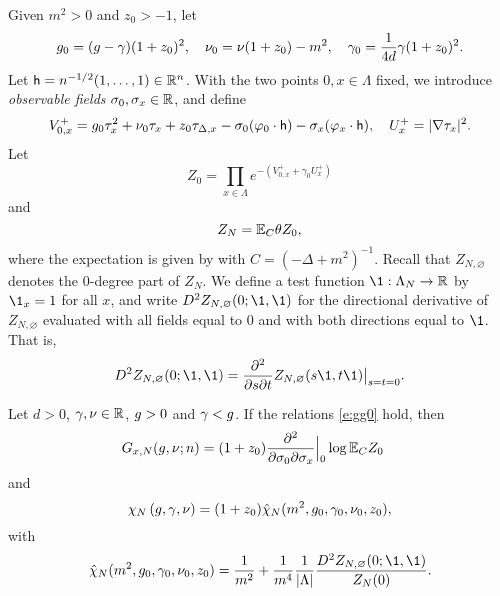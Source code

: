 Given $m^2>0$ and $z_0 >-1$, let
\begin{equation}
\label{e:gg0}
g_0 = (g - \gamma) (1 + z_0)^2,
	\quad
\nu_0 = \nu (1 + z_0) - m^2,
	\quad
\gamma_0 = \frac{1}{4d} \gamma (1 + z_0)^2.
\end{equation}
Let ${\sf h} = n^{-1/2}(1, \ldots, 1) \in {\mathbb R}^n$.
With the two points $0,x\in \Lambda$ fixed,
we introduce \emph{observable fields} $\sigma_0, \sigma_x \in {\mathbb R}$, and define
\begin{equation}
\label{e:V0def}
	V^+_{0,x}
	= g_0\tau_x^2 + \nu_0 \tau_x + z_0 \tau_{\Delta,x} -
	\sigma_0 (\varphi_{0} \cdot {\sf h})
	- \sigma_x (\varphi_{x} \cdot {\sf h}),
	\quad
	U^+_x = |\nabla \tau_x|^2.
\end{equation}
Let
\begin{equation}
\label{e:Z0def}
Z_0 = \prod_{x\in \Lambda} e^{-(V^+_{0,x} + \gamma_0 U^+_x)}
\end{equation}
and
\begin{equation}
\label{e:ZNdef}
Z_N = \mathbb{E}_C \theta Z_0,
\end{equation}
where the expectation is given by  with $C = (-\Delta + m^2)^{-1}$.
Recall that $Z_{N,\varnothing}$ denotes the $0$-degree part of $Z_N$.
We define a test function $\1: \Lambda_N \to \R$ by $\1_x=1$ for all $x$,
and write $D^2 Z_{N,\varnothing}(0; \1, \1)$ for the directional derivative of
$Z_{N,\varnothing}$ evaluated with all fields equal to $0$ and
with both directions equal to $\1$.
That is,
\begin{equation}
D^2 Z_{N,\varnothing}(0; \1, \1)
  =
\ddp{^2}{s\partial t} Z_{N,\varnothing}(s \1, t\1)\big|_{s=t=0}.
\end{equation}

\begin{prop}
\label{prop:intrep}
Let $d > 0$, $\gamma, \nu \in {\mathbb R}$, $g >0$ and $\gamma <g$.
If the relations \eqref{e:gg0} hold, then
\begin{align}
\label{e:generating-fn}
G_{x,N}(g, \nu; n)
	&=
(1+z_0)
\frac{\partial^2 }{\partial \sigma_0  \partial \sigma_x}\Big|_{0}
\log \mathbb{E}_C  Z_0
\end{align}
and
\begin{equation}
\label{e:chichibar}
  \chi_N\left(g,\gamma,\nu\right)
  = (1+z_0)\hat\chi_N(m^2, g_0, \gamma_0, \nu_0, z_0)
  ,
\end{equation}
with
\begin{equation}
\label{e:chibarm}
\hat\chi_N(m^2, g_0, \gamma_0, \nu_0, z_0)
	=
\frac{1}{m^2}
	+
\frac{1}{m^4} \frac{1}{|\Lambda|} \frac{D^2 Z_{N,\varnothing}(0; \1, \1)}{Z_N(0)}.
\end{equation}
\end{prop}

